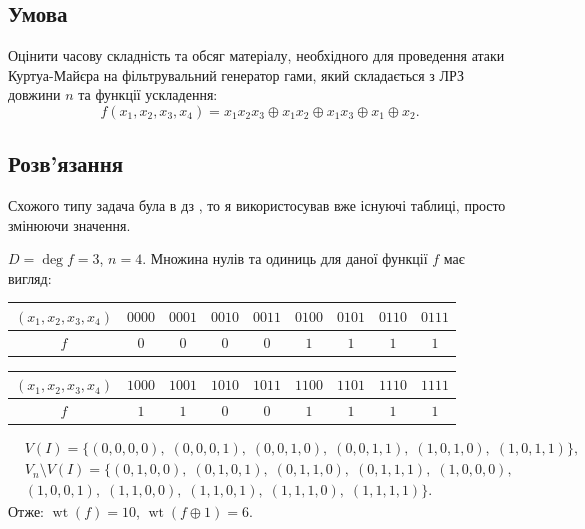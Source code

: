 \chapter{}
\label{chap:1}

\section{Умова}
Оцінити часову складність та обсяг матеріалу, необхідного для проведення атаки
Куртуа-Майєра на фільтрувальний генератор гами, який складається з ЛРЗ довжини $n$
та функції ускладення:
\begin{equation*}
    f(x_{1}, x_{2}, x_{3}, x_{4}) = x_{1}x_{2}x_{3} \oplus x_{1}x_{2} \oplus x_{1}x_{3} \oplus x_{1} \oplus x_{2}.
\end{equation*}

\section{Розв'язання}
Схожого типу задача була в дз , то я використосував вже існуючі таблиці, просто змінюючи значення.

\noindent $D = \deg f = 3$, $n = 4$. Множина нулів та одиниць для даної функції $f$ має вигляд:
\begin{center}
    \begin{tabular}{c|cccccccc}
        $(x_1, x_2, x_3, x_4)$ & $0000$ & $0001$ & $0010$ & $0011$
                               & $0100$ & $0101$ & $0110$ & $0111$                         \\
        \hline
        $f$                    & $0$    & $0$    & $0$    & $0$    & $1$ & $1$ & $1$ & $1$
    \end{tabular}
\end{center}
\begin{center}
    \begin{tabular}{c|cccccccc}
        $(x_1, x_2, x_3, x_4)$ & $1000$ & $1001$ & $1010$ & $1011$
                               & $1100$ & $1101$ & $1110$ & $1111$                         \\
        \hline
        $f$                    & $1$    & $1$    & $0$    & $0$    & $1$ & $1$ & $1$ & $1$
    \end{tabular}
\end{center}
\begin{align*}
    & V (I) = \{(0,0,0,0),\; (0,0,0,1),\; (0,0,1,0),\; (0,0,1,1),\; (1,0,1,0),\; (1,0,1,1)\}, \\
    & V_{n} \setminus V(I) = \{(0,1,0,0),\; (0,1,0,1),\; (0,1,1,0),\; (0,1,1,1),\; (1,0,0,0), \\
    & (1,0,0,1),\; (1,1,0,0),\; (1,1,0,1),\; (1,1,1,0),\; (1,1,1,1)\}.
\end{align*}
Отже: $\operatorname{wt}(f) = 10$, $\operatorname{wt}(f \oplus 1) = 6$.

